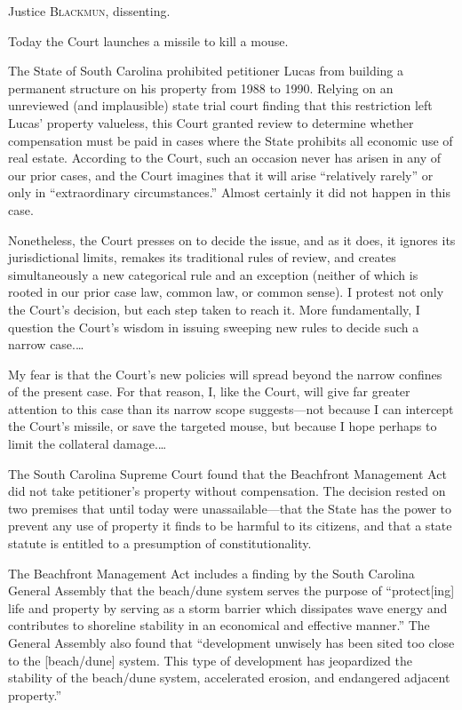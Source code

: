 \opinion Justice \textsc{Blackmun}, dissenting.

Today the Court launches a missile to kill a mouse.

The State of South Carolina prohibited petitioner Lucas from building a
permanent structure on his property from 1988 to 1990. Relying on an unreviewed
(and implausible) state trial court finding that this restriction left Lucas'
property valueless, this Court granted review to determine whether compensation
must be paid in cases where the State prohibits all economic use of real estate.
According to the Court, such an occasion never has arisen in any of our prior
cases, and the Court imagines that it will arise ``relatively rarely'' or only
in ``extraordinary circumstances.'' Almost certainly it did not happen in this
case.

Nonetheless, the Court presses on to decide the issue, and as it does, it
ignores its jurisdictional limits, remakes its traditional rules of review, and
creates simultaneously a new categorical rule and an exception (neither of which
is rooted in our prior case law, common law, or common sense). I protest not
only the Court's decision, but each step taken to reach it. More fundamentally,
I question the Court's wisdom in issuing sweeping new rules to decide such a
narrow case.\ldots

My fear is that the Court's new policies will spread beyond the narrow confines
of the present case. For that reason, I, like the Court, will give far greater
attention to this case than its narrow scope suggests---not because I can
intercept the Court's missile, or save the targeted mouse, but because I hope
perhaps to limit the collateral damage.\ldots

The South Carolina Supreme Court found that the Beachfront Management Act did
not take petitioner's property without compensation. The decision rested on two
premises that until today were unassailable---that the State has the power to
prevent any use of property it finds to be harmful to its citizens, and that a
state statute is entitled to a presumption of constitutionality.

The Beachfront Management Act includes a finding by the South Carolina General
Assembly that the beach/dune system serves the purpose of ``protect[ing] life
and property by serving as a storm barrier which dissipates wave energy and
contributes to shoreline stability in an economical and effective manner.'' The
General Assembly also found that ``development unwisely has been sited too close
to the [beach/dune] system. This type of development has jeopardized the
stability of the beach/dune system, accelerated erosion, and endangered adjacent
property.''

